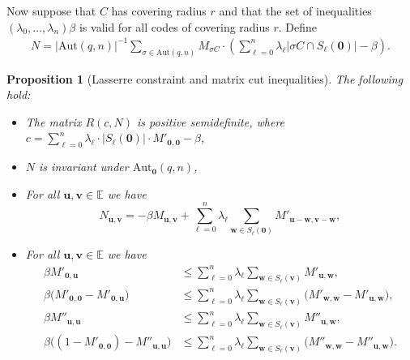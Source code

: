 \documentclass[10pt,a4paper]{article}
\newcommand{\E}{\mathbb{E}}
\newtheorem{proposition}[theorem]{Proposition}
\theoremstyle{definition}
\newcommand{\uu}{\mathbf{u}}
\newcommand{\vv}{\mathbf{v}}
\newcommand{\ww}{\mathbf{w}}
\newcommand{\zero}{\mathbf{0}}
\newcommand{\Aut}{\mathrm{Aut}}
\newcommand{\AutZ}{\mathrm{Aut}_{\zero}}
\begin{document}
Now suppose that $C$ has covering radius $r$ and that the set of inequalities $(\lambda_0,\ldots, \lambda_n)\beta$ is valid for all codes of covering radius $r$.  Define
\begin{align} \label{eq:Nmatrix}
N=|\Aut(q,n)|^{-1} \sum_{\sigma \in \Aut(q,n)} M_{\sigma C}\cdot\left(\sum_{\ell=0}^n\lambda_\ell |\sigma C\cap S_{\ell}(\zero)|-\beta\right).
\end{align}

\begin{proposition}[Lasserre constraint and matrix cut inequalities]\label{prop:third}
The following hold:
\begin{itemize}
\item[\textup{(i)}] The matrix $R(c,N)$ is positive semidefinite, where $c=\sum_{\ell=0}^n \lambda_{\ell}\cdot|S_{\ell}(\zero)|\cdot M'_{\zero,\zero}
 - \beta$,
\item[\textup{(ii)}] $N$ is invariant under $\AutZ(q,n)$,
\item[\textup{(iii)}] For all $\uu,\vv\in \E$ we have 
\[
N_{\uu,\vv}=-\beta M_{\uu,\vv}+\sum_{\ell=0}^n \lambda_\ell\sum_{\ww\in S_{\ell}(\zero)} M'_{\uu-\ww,\vv-\ww},
\]
\item[\textup{(iv)}] For all $\uu,\vv \in \E$ we have
\begin{align*}
\beta M'_{\zero,\uu}
&\leq \sum_{\ell=0}^n \lambda_\ell \sum_{\ww\in S_{\ell}(\vv)} M'_{\uu,\ww},\\
\beta \bigl(M'_{\zero,\zero}-M'_{\zero,\uu}\bigr)
&\leq \sum_{\ell=0}^n \lambda_\ell \sum_{\ww\in S_{\ell}(\vv)} \bigl(M'_{\ww,\ww}-M'_{\uu,\ww}\bigr),\\
\beta M''_{\uu,\uu}
&\leq \sum_{\ell=0}^n \lambda_\ell \sum_{\ww\in S_{\ell}(\vv)} M''_{\uu,\ww},\\
\beta \bigl((1-M'_{\zero,\zero})-M''_{\uu,\uu}\bigr)
&\leq \sum_{\ell=0}^n \lambda_\ell \sum_{\ww\in S_{\ell}(\vv)} \bigl(M''_{\ww,\ww}-M''_{\uu,\ww}\bigr).
\end{align*}
\end{itemize}
\end{proposition}
\end{document}
